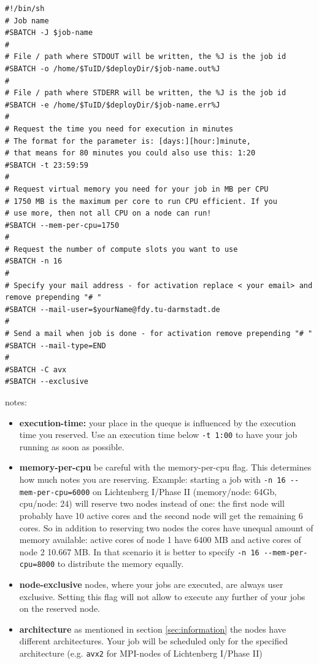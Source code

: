 \documentclass[11pt,twoside,a4paper]{fdyartcl}
\begin{document}
\noindent
\begin{minipage}{\linewidth}
\begin{lstlisting}[caption={Batch-script: head}, 
label={lst:head_batch}]
#!/bin/sh
# Job name
#SBATCH -J $job-name
#
# File / path where STDOUT will be written, the %J is the job id
#SBATCH -o /home/$TuID/$deployDir/$job-name.out%J
#
# File / path where STDERR will be written, the %J is the job id
#SBATCH -e /home/$TuID/$deployDir/$job-name.err%J
#
# Request the time you need for execution in minutes
# The format for the parameter is: [days:][hour:]minute,
# that means for 80 minutes you could also use this: 1:20
#SBATCH -t 23:59:59
#
# Request virtual memory you need for your job in MB per CPU
# 1750 MB is the maximum per core to run CPU efficient. If you
# use more, then not all CPU on a node can run!
#SBATCH --mem-per-cpu=1750
#
# Request the number of compute slots you want to use
#SBATCH -n 16
#
# Specify your mail address - for activation replace < your email> and remove prepending "# "
#SBATCH --mail-user=$yourName@fdy.tu-darmstadt.de
#
# Send a mail when job is done - for activation remove prepending "# "
#SBATCH --mail-type=END
#
#SBATCH -C avx
#SBATCH --exclusive
\end{lstlisting}

\end{minipage}

notes:
\begin{itemize}
	\item[] \textbf{execution-time:} your place in the queque is influenced by the execution time you reserved. Use an execution time below \verb|-t 1:00| to have your job running as soon as possible.
	\item[] \textbf{memory-per-cpu} be careful with the memory-per-cpu flag. This determines how much notes you are reserving. Example: starting a job with \verb|-n 16 --mem-per-cpu=6000| on Lichtenberg I/Phase II (memory/node: 64Gb, cpu/node: 24) will reserve two nodes instead of one: the first node will probably have 10 active cores and the second node will get the remaining 6 cores. So in addition to reserving two nodes the cores have unequal amount of memory available: active cores of node 1 have 6400 MB and active cores of node 2 10.667 MB. In that scenario it is better to specify \verb|-n 16 --mem-per-cpu=8000| to distribute the memory equally.
	\item[] \textbf{node-exclusive} nodes, where your jobs are executed, are always user exclusive. Setting this flag will not allow to execute any further of your jobs on the reserved node.
	\item[] \textbf{architecture} as mentioned in section \ref{sec:information} the nodes have different architectures. Your job will be scheduled only for the specified architecture (e.g. \verb|avx2| for MPI-nodes of Lichtenberg I/Phase II)
\end{itemize}
\end{document}

